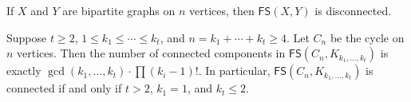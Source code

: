 \documentclass{mystyle}
\newcommand{\FS}{\mathsf{FS}}
\begin{document}
\begin{lemma}\label{lem_bipartite_disconnected}
    If $X$ and $Y$ are bipartite graphs on $n$ vertices, then $\FS(X, Y)$ is disconnected.
\end{lemma}


\begin{lemma}\label{lem_cycle_components}
    Suppose $t \geq 2$, $1 \leq k_1 \leq \cdots \leq k_t$, and $n = k_1 + \cdots + k_t \geq 4$. Let $C_n$ be the cycle on $n$ vertices. Then the number of connected components in $\FS(C_n, K_{k_1, \ldots, k_t})$ is exactly $\gcd(k_1, \ldots, k_t) \cdot \prod (k_i - 1)!$. In particular, $\FS(C_n, K_{k_1, \ldots, k_t})$ is connected if and only if $t > 2$, $k_1 = 1$, and $k_t \leq 2$. 
\end{lemma}
\end{document}
